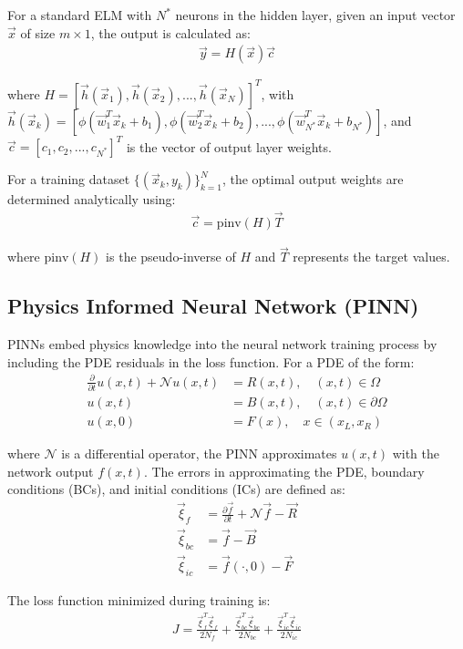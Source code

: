 \documentclass[11pt]{article}
\begin{document}
For a standard ELM with $N^*$ neurons in the hidden layer, given an input vector $\vec{x}$ of size $m \times 1$, the output is calculated as:
\begin{align}
\vec{y} = H(\vec{x})\vec{c}
\end{align}

where $H = [\vec{h}(\vec{x}_1), \vec{h}(\vec{x}_2), ..., \vec{h}(\vec{x}_N)]^T$, with $\vec{h}(\vec{x}_k) = [\phi(\vec{w}_1^T\vec{x}_k + b_1), \phi(\vec{w}_2^T\vec{x}_k + b_2), ..., \phi(\vec{w}_{N^*}^T\vec{x}_k + b_{N^*})]$, and $\vec{c} = [c_1, c_2, ..., c_{N^*}]^T$ is the vector of output layer weights.

For a training dataset $\{(\vec{x}_k, y_k)\}_{k=1}^N$, the optimal output weights are determined analytically using:
\begin{align}
\vec{c} = \text{pinv}(H)\vec{T}
\end{align}

where $\text{pinv}(H)$ is the pseudo-inverse of $H$ and $\vec{T}$ represents the target values.

\subsection{Physics Informed Neural Network (PINN)}

PINNs embed physics knowledge into the neural network training process by including the PDE residuals in the loss function. For a PDE of the form:
\begin{align}
\frac{\partial}{\partial t}u(x,t) + \mathcal{N}u(x,t) &= R(x,t), \quad (x,t) \in \Omega\\
u(x,t) &= B(x,t), \quad (x,t) \in \partial\Omega\\
u(x,0) &= F(x), \quad x \in (x_L, x_R)
\end{align}

where $\mathcal{N}$ is a differential operator, the PINN approximates $u(x,t)$ with the network output $f(x,t)$. The errors in approximating the PDE, boundary conditions (BCs), and initial conditions (ICs) are defined as:
\begin{align}
\vec{\xi}_f &= \frac{\partial \vec{f}}{\partial t} + \mathcal{N}\vec{f} - \vec{R}\\
\vec{\xi}_{bc} &= \vec{f} - \vec{B}\\
\vec{\xi}_{ic} &= \vec{f}(\cdot,0) - \vec{F}
\end{align}

The loss function minimized during training is:
\begin{align}
J = \frac{\vec{\xi}_f^T\vec{\xi}_f}{2N_f} + \frac{\vec{\xi}_{bc}^T\vec{\xi}_{bc}}{2N_{bc}} + \frac{\vec{\xi}_{ic}^T\vec{\xi}_{ic}}{2N_{ic}}
\end{align}
\end{document}
